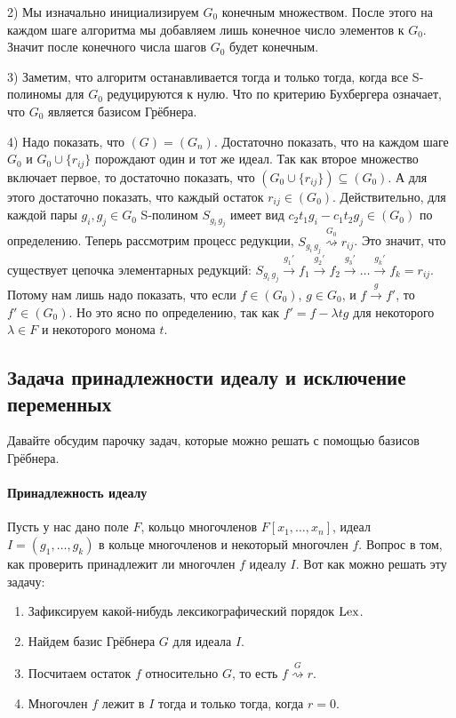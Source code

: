 2) Мы изначально инициализируем $G_0$ конечным множеством.
После этого на каждом шаге алгоритма мы добавляем лишь конечное число элементов к $G_0$.
Значит после конечного числа шагов $G_0$ будет конечным.

3) Заметим, что алгоритм останавливается тогда и только тогда, когда все S-полиномы для $G_0$ редуцируются к нулю.
Что по критерию Бухбергера означает, что $G_0$ является базисом Грёбнера.

4) Надо показать, что $(G) = (G_n)$.
Достаточно показать, что на каждом шаге $G_0$ и $G_0 \cup \{r_{ij}\}$ порождают один и тот же идеал.
Так как второе множество включает первое, то достаточно показать, что $(G_0 \cup \{r_{ij}\}) \subseteq (G_0)$.
А для этого достаточно показать, что каждый остаток $r_{ij}\in (G_0)$.
Действительно, для каждой пары $g_i,g_j\in G_0$ S-полином $S_{g_i\,g_j}$ имеет вид $c_2t_1 g_i - c_1 t_2 g_j\in (G_0)$ по определению.
Теперь рассмотрим процесс редукции, $S_{g_i\,g_j}\stackrel{G_0}{\rightsquigarrow}r_{ij}$.
Это значит, что существует цепочка элементарных редукций: $S_{g_i\,g_j}\stackrel{g_1'}{\longrightarrow}f_1\stackrel{g_2'}{\longrightarrow}f_2\stackrel{g_3'}{\longrightarrow}\ldots\stackrel{g_k'}{\longrightarrow}f_k = r_{ij}$.
Потому нам лишь надо показать, что если $f\in (G_0)$, $g\in G_0$, и $f\stackrel{g}{\longrightarrow}f'$, то $f'\in (G_0)$.
Но это ясно по определению, так как $f' = f - \lambda t g$ для некоторого $\lambda \in F$ и некоторого монома $t$.

\subsection{Задача принадлежности идеалу и исключение переменных}
\label{section::MembershipAndVarElimination}

Давайте обсудим парочку задач, которые можно решать с помощью базисов Грёбнера.

\paragraph{Принадлежность идеалу}

Пусть у нас дано поле $F$, кольцо многочленов $F[x_1,\ldots,x_n]$, идеал $I = (g_1,\ldots,g_k)$ в кольце многочленов и некоторый многочлен $f$.
Вопрос в том, как проверить принадлежит ли многочлен $f$ идеалу $I$.
Вот как можно решать эту задачу:
\begin{enumerate}
\item Зафиксируем какой-нибудь лексикографический порядок $\operatorname{Lex}$.

\item Найдем базис Грёбнера $G$ для идеала $I$.

\item Посчитаем остаток $f$ относительно $G$, то есть $f\stackrel{G}{\rightsquigarrow}r$.

\item Многочлен $f$ лежит в $I$ тогда и только тогда, когда $r = 0$.
\end{enumerate}

